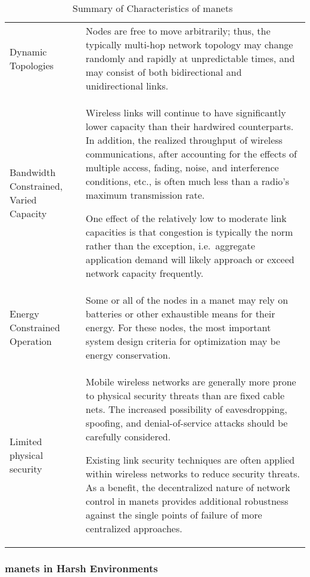 \begin{table}[h!]
\caption[Summary of Characteristics of \glspl{manet}]{Summary of Characteristics of \glspl{manet}~\citet{Corson1999}}
\label{tab:manet_characteristics}
  \begin{tabularx}{\textwidth}{p{2cm}X}\toprule
    Dynamic Topologies & Nodes are free to move arbitrarily; thus, the typically multi-hop network topology may change randomly and rapidly at unpredictable times, and may consist of both bidirectional and unidirectional links.
\\
    Bandwidth Constrained, Varied Capacity & Wireless links will continue to have significantly lower capacity than their hardwired counterparts.
In addition, the realized throughput of wireless communications, after accounting for the effects of multiple access, fading, noise, and interference conditions, etc., is often much less than a radio's maximum transmission rate.
\par
One effect of the relatively low to moderate link capacities is that congestion is typically the norm rather than the exception, i.e.\  aggregate application demand will likely approach or exceed network capacity frequently.\\
    Energy Constrained Operation &  Some or all of the nodes in a \gls{manet} may rely on batteries or other exhaustible means for their energy.
For these nodes, the most important system design criteria for optimization may be energy conservation.\\
    Limited physical security & Mobile wireless networks are generally more prone to physical security threats than are fixed cable nets.
The increased possibility of eavesdropping, spoofing, and denial-of-service attacks should be carefully considered.\par
Existing link security techniques are often applied within wireless networks to reduce security threats.
As a benefit, the decentralized nature of network control in \glspl{manet} provides additional robustness against the single points of failure of more centralized approaches.\\\bottomrule
\end{tabularx}
\end{table}


\subsubsection{\glspl{manet} in Harsh Environments}

